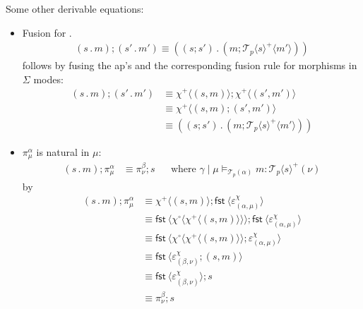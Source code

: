 \documentclass[10pt]{article}
\theoremstyle{definition}
\newcommand\dsd[1]{\ensuremath{\mathsf{#1}}}
\newcommand\TermTwoT[5]{\ensuremath{#1 \mid #3 \vDash_{#5} #2 : #4}}
\newcommand\TrPlus[2]{\ensuremath{{#1}^+(#2)}}
\newcommand\El[2]{\mathcal{T}_{#1}(#2)}
\newcommand\ApEl[2]{\mathcal{T}_{#1}\langle#2\rangle}
\newcommand\ap[2]{\ensuremath{#1 \langle #2 \rangle }}
\newcommand\ApPlus[2]{\ensuremath{{#1}^+ \langle #2 \rangle }}
\newcommand\ApCirc[2]{\ensuremath{{#1}^\circ \langle #2 \rangle }}
\newcommand{\app}[2]{\ensuremath{#1 \: #2}}
\newcommand{\fst}[1]{\app{\dsd{fst}}{#1}}
\newcommand\bdot[0]{\mathbin{.}}
\begin{document}
Some other derivable equations:
\begin{itemize}
\item Fusion for $.$
\begin{align}
\label{dot-fusion}
    (s \bdot m);(s' \bdot m') \equiv ((s;s') \bdot (m;\ApPlus{\ApEl{p}{s}} {m'}))
\end{align}
follows by fusing the ap's and the corresponding fusion rule for morphisms in $\Sigma$ modes:
\begin{align*}
(s \bdot m);(s' \bdot m') &\equiv \ApPlus{\chi}{(s, m)} ; \ApPlus{\chi}{(s', m')} \\
&\equiv \ApPlus{\chi}{(s, m);(s', m')} \\
&\equiv ((s;s') \bdot (m;\ApPlus{\ApEl{p}{s}} {m'}))
\end{align*}

\item $\pi^\alpha_\mu$ is natural in $\mu$:
  \begin{align}
  \label{pi-naturality}
  (s \bdot m); \pi^\alpha_\mu &\equiv \pi^\beta_\nu;s && \text{where } \TermTwoT{\gamma}{m}{\mu}{\TrPlus{\ApEl{p}{s}}{\nu}}{\El{p}{\alpha}}
  \end{align}
  by
  \begin{align*}
  (s \bdot m); \pi^\alpha_\mu 
  &\equiv \ApPlus{\chi}{(s, m)} ; \ap \fst {\varepsilon^\chi_{(\alpha, \mu)}} \\  
  &\equiv \ap{\fst}{\ApCirc{\chi}{\ApPlus{\chi}{(s, m)}}} ; \ap \fst {\varepsilon^\chi_{(\alpha, \mu)}} \\
  &\equiv \ap{\fst}{\ApCirc{\chi}{\ApPlus{\chi}{(s, m)}} ; \varepsilon^\chi_{(\alpha, \mu)}}  \\
  &\equiv \ap{\fst}{\varepsilon^\chi_{(\beta, \nu)}; (s, m) } \\
  &\equiv \ap{\fst}{\varepsilon^\chi_{(\beta, \nu)}} ; s\\
  &\equiv \pi^\beta_\nu ; s
  \end{align*}


\end{itemize}
\end{document}
